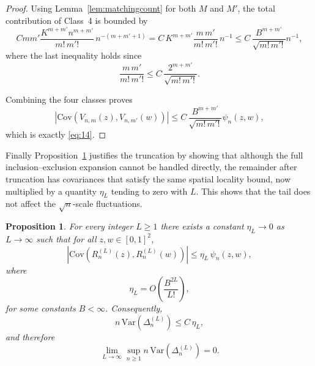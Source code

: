 \documentclass[11pt]{article}
\newtheorem{prop}[thm]{Proposition}
\newcommand{\var}{\mathrm{Var}}
\newcommand{\cov}{\mathrm{Cov}}
\begin{document}
\begin{proof}
Using Lemma~\ref{lem:matchingcount} for both $M$ and $M'$, the total contribution of Class~4 is bounded by
\[
C m m'\frac{K^{m+m'} n^{m+m'}}{m!\,m'!}\,n^{-(m+m'+1)}
=
C\,K^{m+m'}\frac{m\,m'}{m!\,m'!}\,n^{-1}\leq C\,\frac{B^{m + m'}}{\sqrt{m!\,m'!}}n^{-1},
\]
where the last inequality holds since
\[
\frac{m\,m'}{m!\,m'!} \leq C\,\frac{2^{m + m'}}{\sqrt{m!\,m'!}}.
\]

Combining the four classes proves
\[
\left|
\cov\!\left(V_{n,m}(z),V_{n,m'}(w)\right)
\right|
\le
C\,\frac{B^{m+m'}}{\sqrt{m!\,m'!}}
\psi_n(z,w),
\]
which is exactly \eqref{eq:14}.
\end{proof}

Finally Proposition~\ref{prop:tail-covariance} justifies the truncation by showing that although the full inclusion--exclusion expansion cannot be handled directly, the remainder after truncation has covariances that satisfy the same spatial locality bound, now multiplied by a quantity $\eta_L$ tending to zero with $L$. This shows that the tail does not affect the $\sqrt{n}$-scale fluctuations.
\begin{prop}\label{prop:tail-covariance}
For every integer $L \ge 1$ there exists a constant $\eta_L \to 0$ as $L \to \infty$ such that for all $z,w \in [0,1]^2$,
\begin{equation}
\left| \cov\!\left(R_n^{(L)}(z),R_n^{(L)}(w)\right) \right|
\le \eta_L \,\psi_n(z,w),
\label{eq:17}
\end{equation}
where 
\[
\eta_L = O\left(\frac{B^{2L}}{L!}\right),
\]
for some constants $B < \infty$. Consequently,
\begin{equation}
n\,\var(\Delta_n^{(L)}) \le C\,\eta_L,
\label{eq:18}
\end{equation}
and therefore
\[
\lim_{L\to\infty}\sup_{n\ge 1} n\,\var(\Delta_n^{(L)}) = 0.
\]
\end{prop}
\end{document}
